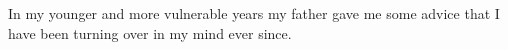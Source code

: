 \begin{jabstract}
In my younger and more vulnerable years my father gave me some advice that I have been turning over in my mind ever since.
\end{jabstract}
